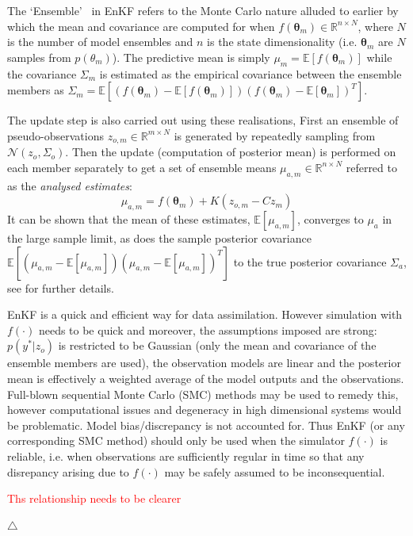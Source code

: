 \documentclass[10pt,a4paper]{article}
\newcommand\xqed[1]{%
  \leavevmode\unskip\penalty9999 \hbox{}\nobreak\hfill
  \quad\hbox{#1}}
\newcommand\demo{\xqed{$\triangle$}}
\newcommand{\red}{\textcolor{red}}
\newcommand{\expect} {{\mathbb{E}}}
\newcommand{\thetab} {{\boldsymbol{\theta}}}
\begin{document}
The \lq Ensemble\rq~ in EnKF refers to the Monte Carlo nature alluded to earlier by which the mean and covariance are computed for when $f(\thetab_m) \in \mathbb{R}^{n \times N}$, where $N$ is the number of model ensembles and $n$ is the state dimensionality (i.e. $\thetab_m$ are $N$ samples from $p(\theta_m)$). The predictive mean is simply $\mu_m = \expect[f(\thetab_m)]$ while the covariance $\Sigma_m$ is estimated as the empirical covariance between the ensemble members as  $\Sigma_m = \expect[(f(\thetab_m) - \expect[f(\thetab_m)])(f(\thetab_m) - \expect[\thetab_m])^T]$. 

The update step is also carried out using these realisations, First an ensemble of pseudo-observations $z_{o,m} \in \mathbb{R}^{m \times N}$ is generated by repeatedly sampling from $\mathcal{N}(z_o,\Sigma_o)$. Then the update (computation of posterior mean) is performed on each member separately to get a set of ensemble means $\mu_{a,m} \in \mathbb{R}^{n \times N}$ referred to as the \emph{analysed estimates}:
\begin{equation}
\mu_{a,m} = f(\thetab_m) + K(z_{o,m} - Cz_m)
\end{equation}
It can be shown that the mean of these estimates, $\expect[\mu_{a,m}]$, converges to $\mu_a$ in the large sample limit, as does the sample posterior covariance $\expect[(\mu_{a,m} - \expect[\mu_{a,m}])(\mu_{a,m} - \expect[\mu_{a,m}])^T]$ to the true posterior covariance $\Sigma_a$, see \cite{Burgers_1998} for further details.

EnKF is a quick and efficient way for data assimilation. However simulation with $f(\cdot)$ needs to be quick and moreover, the assumptions imposed are strong: $p(y^* | z_o)$ is restricted to be Gaussian (only the mean and covariance of the ensemble members are used), the observation models are linear and the posterior mean is effectively a weighted average of the model outputs and the observations. Full-blown sequential Monte Carlo (SMC) methods may be used to remedy this, however computational issues and degeneracy in high dimensional systems would be problematic. Model bias/discrepancy is not accounted for. Thus EnKF (or any corresponding SMC method) should only be used when the simulator $f(\cdot)$ is reliable, i.e. when observations are sufficiently regular in time so that any disrepancy arising due to $f(\cdot)$ may be safely assumed to be inconsequential.

\red{Ths relationship needs to be clearer}

\demo
\end{document}
